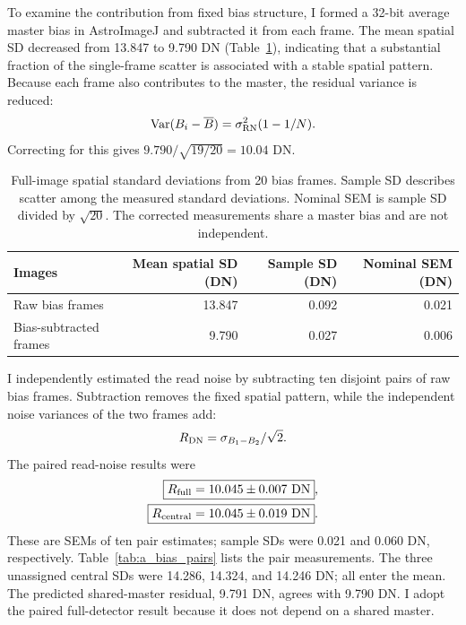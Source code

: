 \documentclass[12pt,letterpaper,twocolumn]{article}
\begin{document}
To examine the contribution from fixed bias structure, I formed a
32-bit average master bias in AstroImageJ and subtracted it from each
frame. The mean spatial SD decreased from 13.847 to 9.790 DN
(Table~\ref{tab:a_bias_statistics}), indicating that a substantial
fraction of the single-frame scatter is associated with a stable spatial
pattern. Because each frame also contributes to the master, the residual
variance is reduced:
\begin{equation}
\mathrm{Var}(B_i-\overline B)=\sigma_{\rm RN}^2(1-1/N).
\end{equation}
Correcting for this gives $9.790/\sqrt{19/20}=10.04$ DN.
\begin{table}[tp]
 \centering\small
 \caption{Full-image spatial standard deviations from 20 bias frames.
 Sample SD describes scatter among the measured standard deviations.
 Nominal SEM is sample SD divided by $\sqrt{20}$. The corrected
 measurements share a master bias and are not independent.}
 \label{tab:a_bias_statistics}
 \begin{tabular}{lrrr}
  \toprule
  Images & Mean spatial SD (DN) & Sample SD (DN) & Nominal SEM (DN)\\
  \midrule
  Raw bias frames & 13.847 & 0.092 & 0.021\\
  Bias-subtracted frames & 9.790 & 0.027 & 0.006\\
  \bottomrule
 \end{tabular}
\end{table}
I independently estimated the read noise by subtracting ten disjoint
pairs of raw bias frames. Subtraction removes the fixed spatial pattern,
while the independent noise variances of the two frames add:
\begin{equation}
R_{\rm DN}=\sigma_{B_1-B_2}/\sqrt{2}.
\end{equation}
The paired read-noise results were
\begin{align}
\boxed{R_{\rm full}=10.045\pm0.007~\mathrm{DN}},\\
\boxed{R_{\rm central}=10.045\pm0.019~\mathrm{DN}}.
\end{align} These are SEMs of ten
pair estimates; sample SDs were 0.021 and 0.060 DN, respectively.
Table~\ref{tab:a_bias_pairs} lists the pair measurements. The three
unassigned central SDs were 14.286, 14.324, and 14.246 DN; all enter
the mean. The predicted shared-master residual, 9.791 DN, agrees
with 9.790 DN. I adopt the paired full-detector result because it
does not depend on a shared master.
\end{document}
